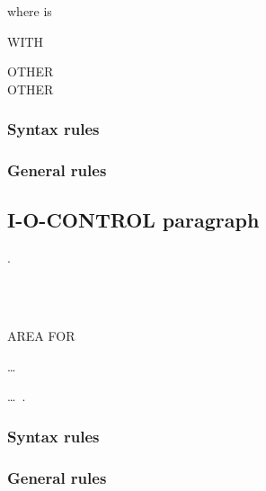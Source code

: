 where  is

\begin{syntax}
   WITH
  \begin{1=}
     OTHER \\
     OTHER \\
     
  \end{1=}
\end{syntax}

\subsubsection{Syntax rules}

\subsubsection{General rules}

\subsection{I-O-CONTROL paragraph}
\begin{syntax}
  \begin{0-1}
    .
  \end{0-1}\newline
  \begin{1=}
    \begin{0-1}
       \\
       \\
    \end{0-1}
    AREA FOR
    \begin{1=}
      \filename
    \end{1=}\ldots \\

  \end{1=}\ldots\ {}.
\end{syntax}

\subsubsection{Syntax rules}

\subsubsection{General rules}


